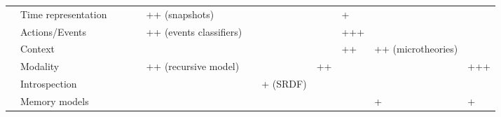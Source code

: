 \begin{landscape}
\begin{table}
\begin{center}
\begin{tabular}{p{0.2cm}p{3.4cm}p{1.6cm}p{1.3cm}p{1.5cm}p{1.7cm}p{1.5cm}p{2cm}p{1.4cm}p{1.4cm}p{1.4cm}|p{1.4cm}}
                                                               & Time representation &                           &                             &                             & ++ (snapshots)              &                             &                                    &                                 & +                             &                               &                                               \\
                                                                    & Actions/Events &                           &                             &                             & ++ (events classifiers)     &                             &                                    &                                 & +++                           &                               &                                               \\
                                                                           & Context &                           &                             &                             &                             &                             &                                    &                                 & ++                            & ++ (microtheories)            &                                               \\
                                                                          & Modality &                           &                             &                             & ++ (recursive model)        &                             &                                    & ++                              &                               &                               & +++                                           \\
                                                                     & Introspection &                           &                             &                             &                             &                             & + (SRDF) \cite{Kunze2011}          &                                 &                               &                               &                                               \\
                                                                     & Memory models &                           &                             &                             &                             &                             &                                    &                                 &                               & +                             & +                                             \\

\end{tabular}
\end{center}
\end{table}
\end{landscape}
